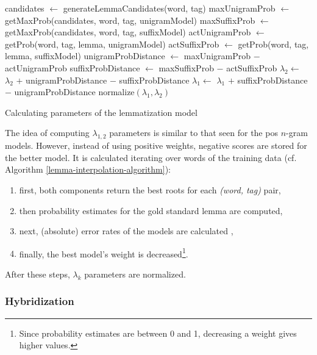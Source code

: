 \begin{algorithm*}
\begin{algorithmic}[H]
        \State candidates $\gets$ generateLemmaCandidates(word, tag)
        \State maxUnigramProb $\gets$ getMaxProb(candidates, word, tag, unigramModel)
        \State maxSuffixProb $\gets$ getMaxProb(candidates, word, tag, suffixModel)
        \State actUnigramProb $\gets$ getProb(word, tag, lemma, unigramModel)
        \State actSuffixProb $\gets$ getProb(word, tag, lemma, suffixModel)
        \State unigramProbDistance $\gets$ maxUnigramProb $-$ actUnigramProb
        \State suffixProbDistance $\gets$ maxSuffixProb $-$ actSuffixProb
            \State $\lambda_{2} \gets$ $\lambda_{2}$ $+$ unigramProbDistance $-$ suffixProbDistance
        \Else%
            \State $\lambda_{1} \gets$ $\lambda_{1}$ $+$ suffixProbDistance $-$ unigramProbDistance
        \EndIf
    \EndFor
    \State normalize$( \lambda_{1}, \lambda_{2} )$
  \end{algorithmic}
  \caption{Calculating parameters of the lemmatization model}
\label{lemma-interpolation-algorithm}
\end{algorithm*}

The idea of computing $\lambda_{1,2}$ parameters is similar to that seen for the \gls{pos} $n$-gram models. 
However, instead of using positive weights, negative scores are stored for the better model.  
It is calculated iterating over words of the training data (cf. Algorithm \ref{lemma-interpolation-algorithm}):
\begin{enumerate}
  \item first, both components return the best roots for each \emph{(word, tag)} pair, 
  \item then probability estimates for the gold standard lemma are computed,
  \item next, (absolute) error rates of the models are calculated ,
  \item finally, the best model’s weight is decreased\footnote{Since probability estimates are between 0 and 1, decreasing a weight gives higher values.}.
\end{enumerate}
After these steps, $\lambda_k$ parameters are normalized.


\subsubsection{Hybridization}

